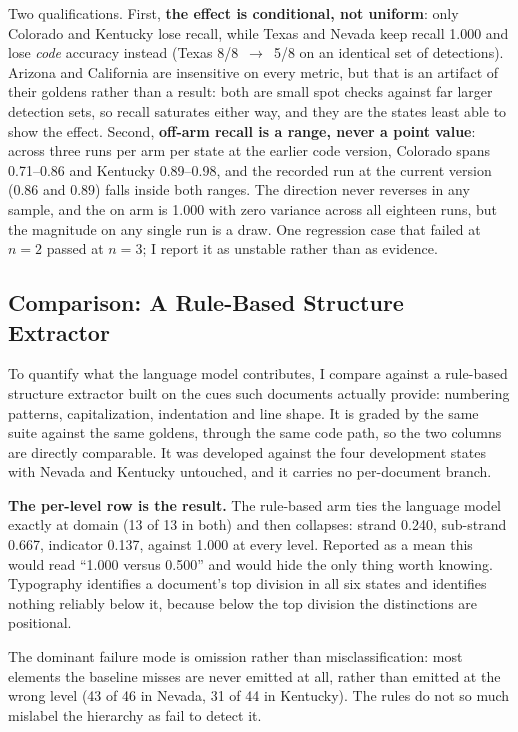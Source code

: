 Two qualifications. First, \textbf{the effect is conditional, not
uniform}: only Colorado and Kentucky lose recall, while Texas and Nevada keep
recall 1.000 and lose \emph{code} accuracy instead (Texas 8/8~$\rightarrow$~5/8
on an identical set of detections). Arizona and California are insensitive on
every metric, but that is an artifact of their goldens rather than a result:
both are small spot checks against far larger detection sets, so recall
saturates either way, and they are the states least able to show the effect.
Second, \textbf{off-arm recall is a range, never a point value}: across three
runs per arm per state at the earlier code version, Colorado spans 0.71--0.86
and Kentucky 0.89--0.98, and the recorded run at the current version (0.86 and
0.89) falls inside both ranges. The
direction never reverses in any sample, and the on arm is 1.000 with zero
variance across all eighteen runs, but the magnitude on any single run is a
draw. One regression case that failed at $n{=}2$ passed at $n{=}3$; I report it
as unstable rather than as evidence.

\subsection{Comparison: A Rule-Based Structure Extractor}
\label{sec:experiments-baseline}

To quantify what the language model contributes, I compare against a
rule-based structure extractor built on the cues such documents actually
provide: numbering patterns, capitalization, indentation and line shape. It is
graded by the same suite against the same goldens, through the same code path,
so the two columns are directly comparable. It was developed against the four
development states with Nevada and Kentucky untouched, and it carries no
per-document branch.



\textbf{The per-level row is the result.} The rule-based arm ties the language
model exactly at domain (13 of 13 in both) and then collapses: strand
0.240, sub-strand 0.667, indicator 0.137, against 1.000 at every level. Reported
as a mean this would read ``1.000 versus 0.500'' and would hide the only thing
worth knowing. Typography identifies a document's top division in all six
states and identifies nothing reliably below it, because below the top division
the distinctions are positional.

The dominant failure mode is omission rather than misclassification: most
elements the baseline misses are never emitted at all, rather than emitted at
the wrong level (43 of 46 in Nevada, 31 of 44 in Kentucky). The rules do not
so much mislabel the hierarchy as fail to detect it.

